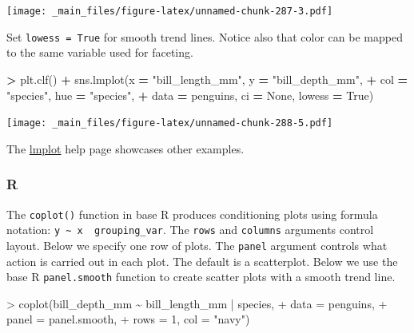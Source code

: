 \documentclass[
]{book}
\newenvironment{Shaded}{\begin{snugshade}}{\end{snugshade}}
\newcommand{\AttributeTok}[1]{\textcolor[rgb]{0.77,0.63,0.00}{#1}}
\newcommand{\DecValTok}[1]{\textcolor[rgb]{0.00,0.00,0.81}{#1}}
\newcommand{\FunctionTok}[1]{\textcolor[rgb]{0.00,0.00,0.00}{#1}}
\newcommand{\NormalTok}[1]{#1}
\newcommand{\OperatorTok}[1]{\textcolor[rgb]{0.81,0.36,0.00}{\textbf{#1}}}
\newcommand{\SpecialCharTok}[1]{\textcolor[rgb]{0.00,0.00,0.00}{#1}}
\newcommand{\StringTok}[1]{\textcolor[rgb]{0.31,0.60,0.02}{#1}}
\newcommand{\VariableTok}[1]{\textcolor[rgb]{0.00,0.00,0.00}{#1}}
\begin{document}
\texttt{[image: \_main\_files/figure-latex/unnamed-chunk-287-3.pdf]}

Set \texttt{lowess\ =\ True} for smooth trend lines. Notice also that color can be mapped to the same variable used for faceting.

\begin{Shaded}
\begin{Highlighting}[]
\OperatorTok{\textgreater{}}\NormalTok{ plt.clf()}
\OperatorTok{+}\NormalTok{ sns.lmplot(x }\OperatorTok{=} \StringTok{"bill\_length\_mm"}\NormalTok{, y }\OperatorTok{=} \StringTok{"bill\_depth\_mm"}\NormalTok{, }
\OperatorTok{+}\NormalTok{            col }\OperatorTok{=} \StringTok{"species"}\NormalTok{, hue }\OperatorTok{=} \StringTok{"species"}\NormalTok{,}
\OperatorTok{+}\NormalTok{            data }\OperatorTok{=}\NormalTok{ penguins, ci }\OperatorTok{=} \VariableTok{None}\NormalTok{, lowess }\OperatorTok{=} \VariableTok{True}\NormalTok{)}
\end{Highlighting}
\end{Shaded}

\texttt{[image: \_main\_files/figure-latex/unnamed-chunk-288-5.pdf]}

The \href{https://seaborn.pydata.org/generated/seaborn.lmplot.html\#seaborn.lmplot}{lmplot} help page showcases other examples.

\hypertarget{r-46}{%
\subsubsection*{R}\label{r-46}}

The \texttt{coplot()} function in base R produces conditioning plots using formula notation: \texttt{y\ \textasciitilde{}\ x\ \textbar{}\ grouping\_var}. The \texttt{rows} and \texttt{columns} arguments control layout. Below we specify one row of plots. The \texttt{panel} argument controls what action is carried out in each plot. The default is a scatterplot. Below we use the base R \texttt{panel.smooth} function to create scatter plots with a smooth trend line.

\begin{Shaded}
\begin{Highlighting}[]
\SpecialCharTok{\textgreater{}} \FunctionTok{coplot}\NormalTok{(bill\_depth\_mm }\SpecialCharTok{\textasciitilde{}}\NormalTok{ bill\_length\_mm }\SpecialCharTok{|}\NormalTok{ species, }
\SpecialCharTok{+}        \AttributeTok{data =}\NormalTok{ penguins,}
\SpecialCharTok{+}        \AttributeTok{panel =}\NormalTok{ panel.smooth,}
\SpecialCharTok{+}        \AttributeTok{rows =} \DecValTok{1}\NormalTok{, }\AttributeTok{col =} \StringTok{"navy"}\NormalTok{)}
\end{Highlighting}
\end{Shaded}
\end{document}
